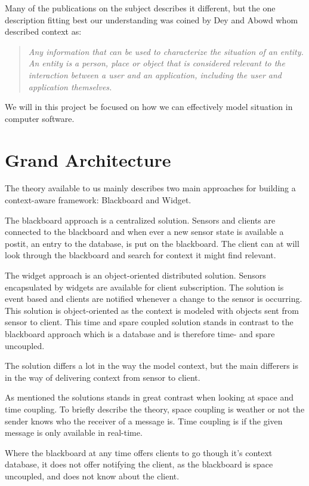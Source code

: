 \documentclass[]{report}
\begin{document}
Many of the publications on the subject describes it different, but the one description fitting best our understanding was coined by Dey and Abowd whom described context as:


\blockquote{
	\textit{Any information that can be used to characterize the situation of an entity. An entity is a person, place or object that is considered relevant to the interaction between a user and an application, including the user and application themselves.} \cite{Dey and Abowd (2000)} 
}

We will in this project be focused on how we can effectively model situation in computer software.


\section{Grand Architecture}
The theory available to us mainly describes two main approaches for building a context-aware framework: Blackboard and Widget.


The blackboard approach is a centralized solution. Sensors and clients are connected to the blackboard and when ever a new sensor state is available a postit, an entry to the database, is put on the blackboard. The client can at will look through the blackboard and search for context it might find relevant.

The widget approach is an object-oriented distributed solution. Sensors encapsulated by widgets are available for client subscription. The solution is event based and clients are notified whenever a change to the sensor is occurring. This solution is object-oriented as the context is modeled with objects sent from sensor to client. This time and spare coupled solution stands in contrast to the blackboard approach which is a database and is therefore time- and spare uncoupled.

The solution differs a lot in the way the model context, but the main differers is in the way of delivering context from sensor to client.

As mentioned the solutions stands in great contrast when looking at space and time coupling. To briefly describe the theory, space coupling is weather or not the sender knows who the receiver of a message is. Time coupling is if the given message is only available in real-time. 

Where the blackboard at any time offers clients to go though it's context database, it does not offer notifying the client, as the blackboard is space uncoupled, and does not know about the client.
\end{document}
